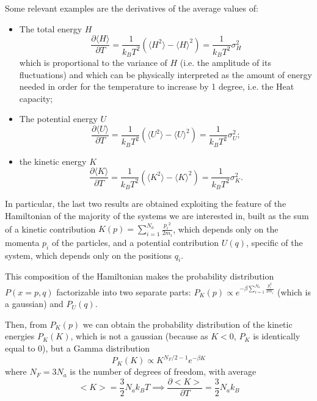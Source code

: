 Some relevant examples are the derivatives of the average values of:
\begin{itemize}
    \item The total energy $H$
    \begin{equation}
      \frac{\partial \langle H \rangle}{\partial T}=\frac{1}{k_B T^2} (\langle H^2\rangle-\langle H\rangle^2)=\frac{1}{k_B T^2}\sigma_H^2
    \end{equation} 
    which is proportional to the variance of $H$ (i.e. the amplitude of its fluctuations) and which can be physically interpreted as the amount of energy needed in order for the temperature to increase by 1 degree, i.e. the Heat capacity; 
    \item The potential energy $U$
    \begin{equation}
        \frac{\partial \langle U \rangle}{\partial T}=\frac{1}{k_B T^2} (\langle U^2 \rangle -\langle U \rangle^2)=\frac{1}{k_B T^2}\sigma_U^2 ;
    \end{equation}
    \item the kinetic energy $K$
    \begin{equation}
        \frac{\partial \langle K \rangle}{\partial T}=\frac{1}{k_B T^2} (\langle K^2\rangle-\langle K \rangle^2)=\frac{1}{k_B T^2}\sigma_K^2 .
    \end{equation}
\end{itemize}

In particular, the last two results are obtained exploiting the feature of the Hamiltonian of the majority of the systems we are interested in, built as the sum of a kinetic contribution \begin{math} K(p)=\sum_{i=1}^{N_a} \frac{{p_i}^2}{2m_i} \end{math}, which depends only on the momenta $p_i$ of the particles, and a potential contribution $U(q)$, specific of the system, which depends only on the positions $q_i$. 

This composition of the Hamiltonian makes the probability distribution $P(x=p,q)$ factorizable into two separate parts: \begin{math}P_K(p) \propto e^{-\beta \sum_{i=1}^{N_a} \frac{p_i^2}{2m_i}} \end{math} (which is a gaussian) and $P_U(q)$.

Then, from  $P_K(p)$ we can obtain the probability distribution of the kinetic energies $P_K(K)$, which is not a gaussian (because as $K<0$, $P_K$ is identically equal to $0$), but a Gamma distribution
\begin{equation}
    P_K(K) \propto K^{N_F/2 -1}e^{-\beta K}
\end{equation}
where $N_F=3N_a$ is the number of degrees of freedom, with average
\begin{equation}
    <K>=\frac{3}{2} N_a k_B T \implies \frac{\partial <K>}{\partial T}=\frac{3}{2} N_a k_B
\end{equation}

